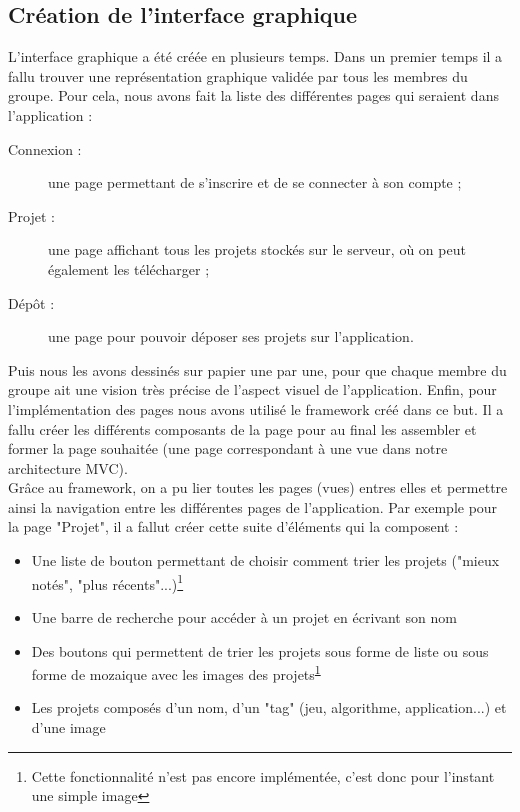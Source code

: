 \documentclass[twoside]{report}
\begin{document}
\subsection{Création de l'interface graphique}
L'interface graphique a été créée en plusieurs temps. Dans un premier temps il a fallu trouver une représentation graphique validée par tous les membres du groupe. Pour cela, nous avons fait la liste des différentes pages qui seraient dans l'application :
\begin{description}
    \item[Connexion :] une page permettant de s'inscrire et de se connecter à son compte ;
    \item[Projet :] une page affichant tous les projets stockés sur le serveur, où on peut également les télécharger ;
    \item[Dépôt :] une page pour pouvoir déposer ses projets sur l'application.
\end{description}
Puis nous les avons dessinés sur papier une par une, pour que chaque membre du groupe ait une vision très précise de l'aspect visuel de l'application.
Enfin, pour l'implémentation des pages nous avons utilisé le framework créé dans ce but. Il a fallu créer les différents composants de la page pour au final les assembler et former la page souhaitée (une page correspondant à une vue dans notre architecture MVC). \\
Grâce au framework, on a pu lier toutes les pages (vues) entres elles et permettre ainsi la navigation entre les différentes pages de l'application.
Par exemple pour la page "Projet", il a fallut créer cette suite d'éléments qui la composent :
\begin{itemize}[label=$-$]
    \item Une liste de bouton permettant de choisir comment trier les projets ("mieux notés", "plus récents"...)\footnote{\label{note}Cette fonctionnalité n'est pas encore implémentée, c'est donc pour l'instant une simple image}
    \item Une barre de recherche pour accéder à un projet en écrivant son nom
    \item Des boutons qui permettent de trier les projets sous forme de liste ou sous forme de mozaique avec les images des projets\textsuperscript{\ref{note}}
    \item Les projets composés d'un nom, d'un "tag" (jeu, algorithme, application...) et d'une image
\end{itemize}
\end{document}
